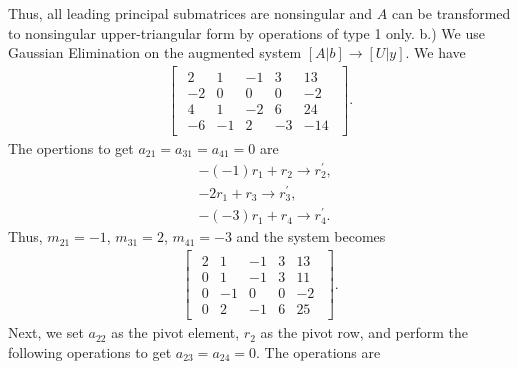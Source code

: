 \documentclass{report}
\begin{document}
                                Thus, all leading principal submatrices are nonsingular and $A$ can be transformed to nonsingular upper-triangular form by operations of type 1 only.
                                \bigbreak \noindent 
                                b.) We use Gaussian Elimination on the augmented system $[A|b] \to [U|y]$. We have
                                \begin{align*}
                                    \begin{bmatrix}
                                        \begin{array}{cccc|c}
                                            2 & 1 & -1 & 3 & 13\\
                                            -2 & 0 & 0 & 0 & -2\\
                                            4 & 1 & -2 & 6 & 24\\
                                            -6 & -1 & 2 & -3 &-14
                                        \end{array}
                                    \end{bmatrix}
                                .\end{align*}
                                The opertions to get $a_{21} = a_{31} = a_{41} = 0$ are
                                \begin{align*}
        &-(-1)r_{1} + r_{2} \to r_{2}^{\prime}, \\
        &-2r_{1} + r_{3} \to r_{3}^{\prime}, \\
        &-(-3)r_{1} + r_{4} \to r_{4}^{\prime}
    .\end{align*}
    Thus, $m_{21} = -1$, $m_{31} = 2$, $m_{41} = -3$ and the system becomes
    \begin{align*}
        \begin{bmatrix}
            \begin{array}{cccc|c}
                2 & 1 & -1 & 3 & 13 \\
                0 & 1 & -1 & 3 & 11 \\
                0 & -1 & 0 & 0 & -2 \\
                0 & 2 & -1 & 6 & 25
            \end{array}
        \end{bmatrix}
    .\end{align*}
    Next, we set $a_{22}$ as the pivot element, $r_{2}$ as the pivot row, and perform the following operations to get $a_{23} = a_{24} = 0$. The operations are
\end{document}
